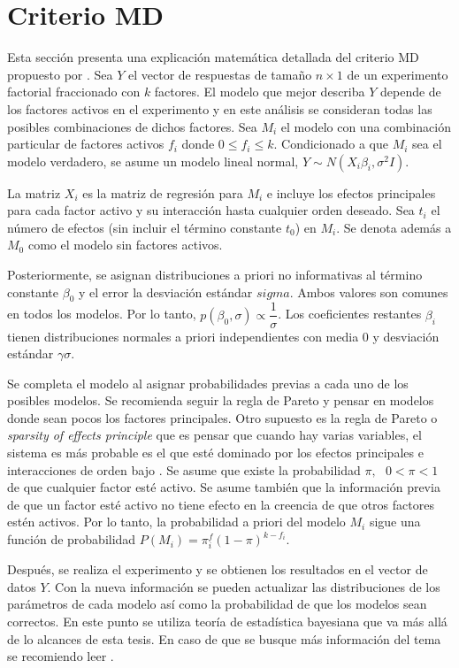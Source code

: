 \section{Criterio MD} \label{seccion_criterioMD}

Esta sección presenta una explicación matemática detallada del criterio MD propuesto por \cite{meyer1996}. Sea \textbf{$Y$} el vector de respuestas de tamaño $n \times 1$ de un experimento factorial fraccionado con $k$ factores. El modelo que mejor describa \textbf{$Y$} depende de los factores activos en el experimento y en este análisis se consideran todas las posibles combinaciones de dichos factores. Sea $M_i$ el modelo con una combinación particular de factores activos $f_i$ donde $0 \leq f_i \leq k$. Condicionado a que $M_i$ sea el modelo verdadero, se asume un modelo lineal normal, $\textbf{$Y$} \sim N(X_i \beta_i, \sigma^2 I).$ 

La matriz $X_i$ es la matriz de regresión para $M_i$ e incluye los efectos principales para cada factor activo y su interacción hasta cualquier orden deseado. Sea $t_i$ el número de efectos (sin incluir el término constante $t_0$) en $M_i$. Se denota además a $M_0$ como el modelo sin factores activos. 

Posteriormente, se asignan distribuciones a priori no informativas al término constante $\beta_0$ y el error la desviación estándar $sigma$. Ambos valores son comunes en todos los modelos. Por lo tanto, $p( \beta_0, \sigma) \propto \dfrac{1}{\sigma}$. Los coeficientes restantes $\beta_i$ tienen distribuciones normales a priori independientes con media 0 y desviación estándar $\gamma \sigma$. 

Se completa el modelo al asignar probabilidades previas a cada uno de los posibles modelos. Se recomienda seguir la regla de Pareto y pensar en modelos donde sean pocos los factores principales. Otro supuesto es la regla de Pareto o \textit{sparsity of effects principle} que es pensar que cuando hay varias variables, el sistema es más probable es el que esté dominado por los efectos principales e interacciones de orden bajo \cite{montgomery2017design}. Se asume que existe la probabilidad $\pi, \text{ } 0 < \pi < 1$ de que cualquier factor esté activo. Se asume también que la información previa de que un factor esté activo no tiene efecto en la creencia de que otros factores estén activos. Por lo tanto, la probabilidad a priori del modelo $M_i$ sigue una función de probabilidad $P(M_i) = \pi ^f_i (1 - \pi)^{k-f_i}.$ 

Después, se realiza el experimento y se obtienen los resultados en el vector de datos \textbf{$Y$}. Con la nueva información se pueden actualizar las distribuciones de los parámetros de cada modelo así como la probabilidad de que los modelos sean correctos. En este punto se utiliza teoría de estadística bayesiana que va más allá de lo alcances de esta tesis. En caso de que se busque más información del tema se recomiendo leer . 

